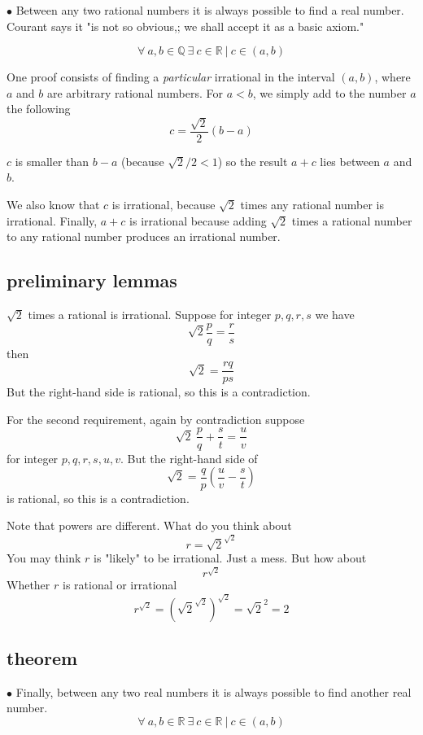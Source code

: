 \documentclass[11pt, oneside]{article}
\begin{document}
$\bullet$  Between any two rational numbers it is always possible to find a real number.  Courant says it "is not so obvious,;  we shall accept it as a basic axiom."

\[ \forall \ a,b \in \mathbb{Q} \ \exists \ c \in \mathbb{R} \ | \ c \in (a,b) \]

One proof consists of finding a \emph{particular} irrational in the interval $(a,b)$, where $a$ and $b$ are arbitrary rational numbers.  For $a < b$, we simply add to the number $a$ the following
\[ c = \frac{\sqrt{2}}{2}(b - a) \]

$c$ is smaller than $b - a$ (because $\sqrt{2}/2 < 1$) so the result $a + c$ lies between $a$ and $b$.  

We also know that $c$ is irrational, because $\sqrt{2}$ times any rational number is irrational.  Finally, $a + c$ is irrational because adding $\sqrt{2}$ times a rational number to any rational number produces an irrational number.

\subsection*{preliminary lemmas}  

$\sqrt{2}$ times a rational is irrational.  Suppose for integer $p, q, r, s$ we have
\[ \sqrt{2} \frac{p}{q} = \frac{r}{s} \]
then
\[ \sqrt{2} = \frac{rq}{ps} \]
But the right-hand side is rational, so this is a contradiction.

For the second requirement, again by contradiction suppose
\[ \sqrt{2} \ \frac{p}{q} +  \frac{s}{t} = \frac{u}{v} \]
for integer $p, q, r, s, u, v$.  But the right-hand side of
\[ \sqrt{2} = \frac{q}{p} ( \frac{u}{v} - \frac{s}{t}) \]
is rational, so this is a contradiction.

Note that powers are different.  What do you think about
\[ r = \sqrt{2}^{\sqrt{2}} \]
You may think $r$ is "likely" to be irrational.  Just a mess.  But how about
\[ r^{\sqrt{2}} \]
Whether $r$ is rational or irrational
\[ r^{\sqrt{2}} = (\sqrt{2}^{\sqrt{2}})^{\sqrt{2}} = \sqrt{2}^2 = 2 \]

\subsection*{theorem}

$\bullet$  Finally, between any two real numbers it is always possible to find another real number.  
\[ \forall \ a,b \in \mathbb{R} \ \exists \ c \in \mathbb{R} \ | \ c \in (a,b) \]
\end{document}

